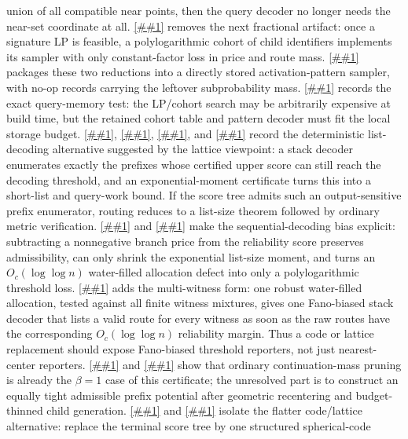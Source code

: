 \documentclass[10pt]{article}
\newcommand{\cref}[1]{\ref{##1}}
\newcommand{\Cref}[1]{\ref{##1}}
\theoremstyle{definition}
\begin{document}
union of all compatible near points, then the query decoder no longer needs the
near-set coordinate at all.
\Cref{lem:sampled-route-cohort} removes the next fractional artifact: once a
signature LP is feasible, a polylogarithmic cohort of child identifiers
implements its sampler with only constant-factor loss in price and route mass.
\Cref{lem:activation-cohort-sampled-compiler} packages these two reductions
into a directly stored activation-pattern sampler, with no-op records carrying
the leftover subprobability mass.
\Cref{cor:activation-cohort-resources} records the exact query-memory test:
the LP/cohort search may be arbitrarily expensive at build time, but the
retained cohort table and pattern decoder must fit the local storage budget.
\Cref{lem:prefix-list-decoder}, \cref{lem:priority-prefix-list-decoder},
\cref{lem:exponential-list-size}, and \cref{cor:prefix-list-resources} record
the deterministic list-decoding
alternative suggested by the lattice viewpoint: a stack decoder enumerates
exactly the prefixes whose certified upper score can still reach the decoding
threshold, and an exponential-moment certificate turns this into a short-list
and query-work bound.  If the score tree admits such an output-sensitive prefix
enumerator, routing reduces to a list-size theorem followed by ordinary metric
verification.
\Cref{lem:fano-biased-prefix-list} and
\cref{cor:waterfilled-fano-bias} make the sequential-decoding bias explicit:
subtracting a nonnegative branch price from the reliability score preserves
admissibility, can only shrink the exponential list-size moment, and turns an
\(O_c(\log\log n)\) water-filled allocation defect into only a polylogarithmic
threshold loss.  \Cref{cor:robust-fano-allocation-compiler} adds the
multi-witness form: one robust water-filled allocation, tested against all
finite witness mixtures, gives one Fano-biased stack decoder that lists a valid
route for every witness as soon as the raw routes have the corresponding
\(O_c(\log\log n)\) reliability margin.  Thus a code or lattice replacement
should expose Fano-biased threshold reporters, not just nearest-center
reporters.
\Cref{lem:continuation-list-certificate} and
\cref{cor:continuation-as-list-decoding} show that ordinary continuation-mass
pruning is already the \(\beta=1\) case of this certificate; the unresolved
part is to construct an equally tight admissible prefix potential after
geometric recentering and budget-thinned child generation.
\Cref{asm:flat-spherical-code-decoder} and
\cref{prop:flat-spherical-code-terminal} isolate the flatter code/lattice
alternative: replace the terminal score tree by one structured spherical-code
\end{document}
